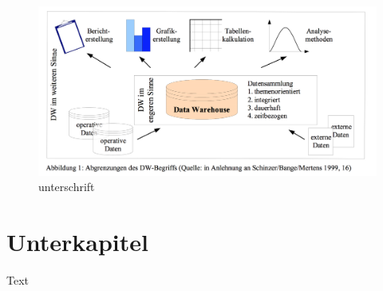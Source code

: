\begin{figure}[H]
    \centering
    \includegraphics[width=.8\textwidth]{files/DWOverview}
    \caption{unterschrift}
    \label{pic:DWOverview}
\end{figure}



\section{Unterkapitel}
\label{Abschnitt:Motivation}


Text

